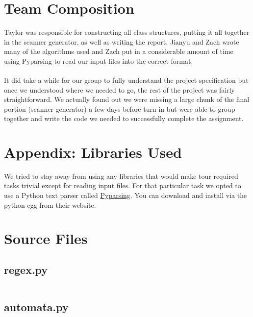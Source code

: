 \documentclass{article}
\begin{document}
\section{Team Composition}
\paragraph{}Taylor was responsible for constructing all class structures, 
putting it all together in the scanner generator, as well as writing
the report. Jianyu and Zach wrote many of the algorithms used and Zach
put in a considerable amount of time using Pyparsing to read our input
files into the correct format.

\paragraph{}It did take a while for our group to fully understand the
project specification but once we understood where we needed to go,
the rest of the project was fairly straightforward. We actually found
out we were missing a large chunk of the final portion (scanner
generator) a few days before turn-in but were able to group together
and write the code we needed to successfully complete the assignment.

\section{Appendix: Libraries Used}
\label{sec:libaries}
\paragraph{} We tried to stay away from using any libraries that would make
tour required tasks trivial except for reading input files. For that
particular task we opted to use a Python text parser called
\href{http://pyparsing.wikispaces.com/}{Pyparsing}. You can download
and install via the python egg from their website.

\section{Source Files}
\label{code}
\subsection{regex.py}
\label{code:regex}
\inputminted{python}{./regex.py}

\subsection{automata.py}
\label{code:automata}
\inputminted{python}{./automata.py}
\end{document}
